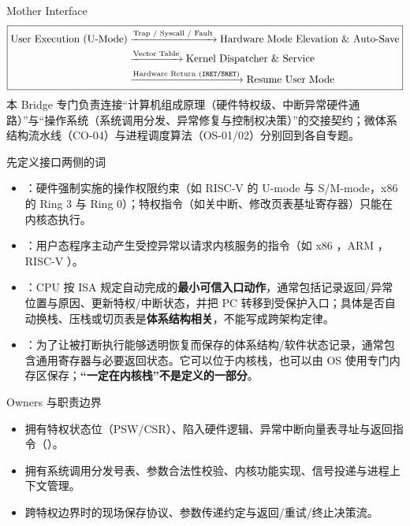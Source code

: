 \documentclass[UTF8,fontset=none,11pt,a4paper]{ctexart}
\begin{document}

\begin{corebox}{Mother Interface}
\[
\boxed{
\begin{aligned}
\text{User Execution (U-Mode)} &\xrightarrow{\text{Trap / Syscall / Fault}} \text{Hardware Mode Elevation \& Auto-Save} \\
&\xrightarrow{\text{Vector Table}} \text{Kernel Dispatcher \& Service} \\
&\xrightarrow{\text{Hardware Return (\texttt{IRET/SRET})}} \text{Resume User Mode}
\end{aligned}
}
\]
本 Bridge 专门负责连接“计算机组成原理（硬件特权级、中断异常硬件通路）”与“操作系统（系统调用分发、异常修复与控制权决策）”的交接契约；微体系结构流水线（CO-04）与进程调度算法（OS-01/02）分别回到各自专题。
\end{corebox}

\begin{methodbox}{先定义接口两侧的词}
\begin{itemize}
  \item {}：硬件强制实施的操作权限约束（如 RISC-V 的 U-mode 与 S/M-mode，x86 的 Ring 3 与 Ring 0）；特权指令（如关中断、修改页表基址寄存器）只能在内核态执行。
  \item {}：用户态程序主动产生受控异常以请求内核服务的指令（如 x86 ，ARM ，RISC-V ）。
  \item {}：CPU 按 ISA 规定自动完成的\textbf{最小可信入口动作}，通常包括记录返回/异常位置与原因、更新特权/中断状态，并把 PC 转移到受保护入口；具体是否自动换栈、压栈或切页表是\textbf{体系结构相关}，不能写成跨架构定律。
  \item {}：为了让被打断执行能够透明恢复而保存的体系结构/软件状态记录，通常包含通用寄存器与必要返回状态。它可以位于内核栈，也可以由 OS 使用专门内存区保存；\textbf{“一定在内核栈”不是定义的一部分}。
\end{itemize}
\end{methodbox}

\begin{methodbox}{Owners 与职责边界}
\begin{itemize}
  \item {}拥有特权状态位（PSW/CSR）、陷入硬件逻辑、异常中断向量表寻址与返回指令（）。
  \item {}拥有系统调用分发号表、参数合法性校验、内核功能实现、信号投递与进程上下文管理。
  \item {}跨特权边界时的现场保存协议、参数传递约定与返回/重试/终止决策流。
\end{itemize}
\end{methodbox}
\end{document}
